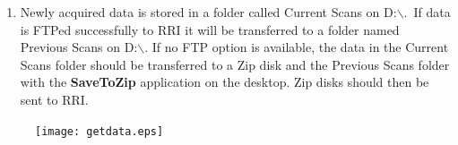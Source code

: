 \documentclass[10pt]{article}
\begin{document}
\begin{enumerate}
\item Newly acquired data is stored in a folder called Current
Scans on D:$\backslash$.~If data is FTPed successfully to RRI it
will be transferred to a folder named Previous Scans on
D:$\backslash$. If no FTP option is available, the data in the
Current Scans folder should be transferred to a Zip disk and the
Previous Scans folder with the {\bf SaveToZip} application on the
desktop. Zip disks should then be sent to RRI.

\end{enumerate}

\begin{figure}[b]
\begin{center}
\texttt{[image: getdata.eps]}
\end{center}
\end{figure}
\end{document}
